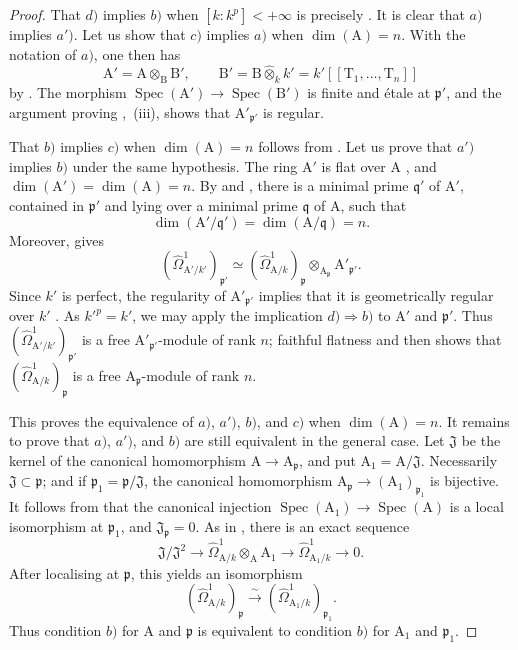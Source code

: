 \begin{proof}
That $d)$ implies $b)$ when $[k:k^p]<+\infty$ is precisely . It is clear that $a)$ implies $a')$. Let us show that $c)$ implies $a)$ when $\dim(\mathrm{A})=n$. With the notation of $a)$, one then has
\[
  \mathrm{A}'=\mathrm{A}\otimes_{\mathrm{B}}\mathrm{B}',
  \qquad
  \mathrm{B}'=\mathrm{B}\widehat{\otimes}_kk'=k'[[\mathrm{T}_1,\ldots,\mathrm{T}_n]]
\]
by . The morphism $\operatorname{Spec}(\mathrm{A}')\to\operatorname{Spec}(\mathrm{B}')$ is finite and \'etale at $\mathfrak p'$, and the argument proving ,~(iii), shows that $\mathrm{A}'_{\mathfrak p'}$ is regular.

That $b)$ implies $c)$ when $\dim(\mathrm{A})=n$ follows from . Let us prove that $a')$ implies $b)$ under the same hypothesis. The ring $\mathrm{A}'$ is flat over $\mathrm{A}$ , and $\dim(\mathrm{A}')=\dim(\mathrm{A})=n$. By  and , there is a minimal prime $\mathfrak q'$ of $\mathrm{A}'$, contained in $\mathfrak p'$ and lying over a minimal prime $\mathfrak q$ of $\mathrm{A}$, such that
\[
  \dim(\mathrm{A}'/\mathfrak q')=\dim(\mathrm{A}/\mathfrak q)=n.
\]
Moreover,  gives
\[
  (\hat{\Omega}^1_{\mathrm{A}'/k'})_{\mathfrak p'}
  \simeq(\hat{\Omega}^1_{\mathrm{A}/k})_\mathfrak p
  \otimes_{\mathrm{A}_\mathfrak p}\mathrm{A}'_{\mathfrak p'}.
\]
Since $k'$ is perfect, the regularity of $\mathrm{A}'_{\mathfrak p'}$ implies that it is geometrically regular over $k'$ . As $k'^p=k'$, we may apply the implication $d)\Rightarrow b)$ to $\mathrm{A}'$ and $\mathfrak p'$. Thus $(\hat{\Omega}^1_{\mathrm{A}'/k'})_{\mathfrak p'}$ is a free $\mathrm{A}'_{\mathfrak p'}$-module of rank $n$; faithful flatness  and  then shows that $(\hat{\Omega}^1_{\mathrm{A}/k})_\mathfrak p$ is a free $\mathrm{A}_\mathfrak p$-module of rank $n$.

This proves the equivalence of $a)$, $a')$, $b)$, and $c)$ when $\dim(\mathrm{A})=n$.
It remains to prove that $a)$, $a')$, and $b)$ are still equivalent in the general case.
Let $\mathfrak J$ be the kernel of the canonical homomorphism $\mathrm{A}\to\mathrm{A}_\mathfrak p$, and put $\mathrm{A}_1=\mathrm{A}/\mathfrak J$. Necessarily $\mathfrak J\subset\mathfrak p$; and if $\mathfrak p_1=\mathfrak p/\mathfrak J$, the canonical homomorphism $\mathrm{A}_\mathfrak p\to(\mathrm{A}_1)_{\mathfrak p_1}$ is bijective. It follows from  that the canonical injection $\operatorname{Spec}(\mathrm{A}_1)\to\operatorname{Spec}(\mathrm{A})$ is a local isomorphism at $\mathfrak p_1$, and $\mathfrak J_\mathfrak p=0$. As in , there is an exact sequence
\[
  \mathfrak J/\mathfrak J^2
  \longrightarrow \hat{\Omega}^1_{\mathrm{A}/k}\otimes_{\mathrm{A}}\mathrm{A}_1
  \longrightarrow \hat{\Omega}^1_{\mathrm{A}_1/k}\longrightarrow0.
\]
After localising at $\mathfrak p$, this yields an isomorphism
\[
  (\hat{\Omega}^1_{\mathrm{A}/k})_\mathfrak p
  \xrightarrow{\sim}
  (\hat{\Omega}^1_{\mathrm{A}_1/k})_{\mathfrak p_1}.
\]
Thus condition $b)$ for $\mathrm{A}$ and $\mathfrak p$ is equivalent to condition $b)$ for $\mathrm{A}_1$ and $\mathfrak p_1$.


\end{proof}
